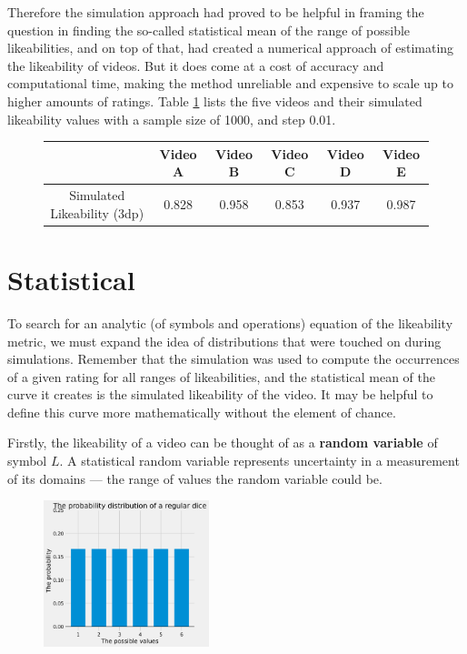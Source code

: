 \documentclass[a4paper,11pt]{article}
\begin{document}
Therefore the simulation approach had proved to be helpful in framing the question in finding the so-called statistical mean of the range of possible likeabilities, and on top of that, had created a numerical approach of estimating the likeability of videos. But it does come at a cost of accuracy and computational time, making the method unreliable and expensive to scale up to higher amounts of ratings. Table \ref{tbl:simulation} lists the five videos and their simulated likeability values with a sample size of 1000, and step 0.01.

\begin{figure}[H]
    \centering
    \begin{tabular}{c|c|c|c|c|c}
        & Video A & Video B & Video C & Video D & Video E \\
        \hline
        \hline
        Simulated Likeability (3dp) & 0.828 & 0.958 &  0.853 & 0.937 & 0.987
    \end{tabular}
    \label{tbl:simulation}
\end{figure}

\section{Statistical}

To search for an analytic (of symbols and operations) equation of the likeability metric, we must expand the idea of distributions that were touched on during simulations. Remember that the simulation was used to compute the occurrences of a given rating for all ranges of likeabilities, and the statistical mean of the curve it creates is the simulated likeability of the video. It may be helpful to define this curve more mathematically without the element of chance.

Firstly, the likeability of a video can be thought of as a \textbf{random variable} of symbol $L$. A statistical random variable represents uncertainty in a measurement of its domains --- the range of values the random variable could be.

\begin{figure}
    \includegraphics[width=0.43\textwidth,right]{assets/discrete_uniform_pdfs.png}
    \caption{}
    \label{fig:discrete_uniform}
\end{figure}
\end{document}
